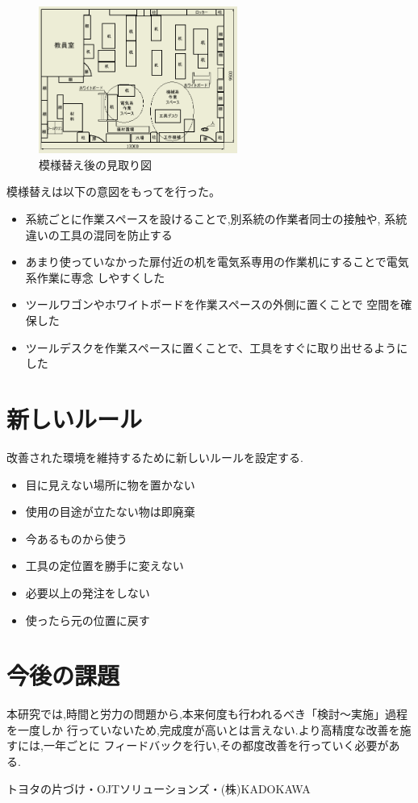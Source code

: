 \documentclass[twocolumn,11pt]{abst}
\begin{document}
\begin{figure}[htbp]
  \begin{center}
    \includegraphics[width=65mm]{aftercad.png}
    \end{center}
  \caption{模様替え後の見取り図}
 \label{after}
\end{figure}
\par 模様替えは以下の意図をもってを行った。
\begin{itemize}
\item 系統ごとに作業スペースを設けることで,別系統の作業者同士の接触や,
系統違いの工具の混同を防止する
\item あまり使っていなかった扉付近の机を電気系専用の作業机にすることで電気系作業に専念
しやすくした
\item ツールワゴンやホワイトボードを作業スペースの外側に置くことで
空間を確保した
\item ツールデスクを作業スペースに置くことで、工具をすぐに取り出せるようにした
\end{itemize}


\section{新しいルール}
改善された環境を維持するために新しいルールを設定する.
\begin{itemize}
\item 目に見えない場所に物を置かない
\item 使用の目途が立たない物は即廃棄
\item 今あるものから使う
\item 工具の定位置を勝手に変えない
\item 必要以上の発注をしない
\item 使ったら元の位置に戻す
\end{itemize}

\section{今後の課題}
本研究では,時間と労力の問題から,本来何度も行われるべき「検討～実施」過程を一度しか
行っていないため,完成度が高いとは言えない.より高精度な改善を施すには,一年ごとに
フィードバックを行い,その都度改善を行っていく必要がある.

\begin{thebibliography}{2}
 トヨタの片づけ・OJTソリューションズ・(株)KADOKAWA
\end{thebibliography}
\end{document}
